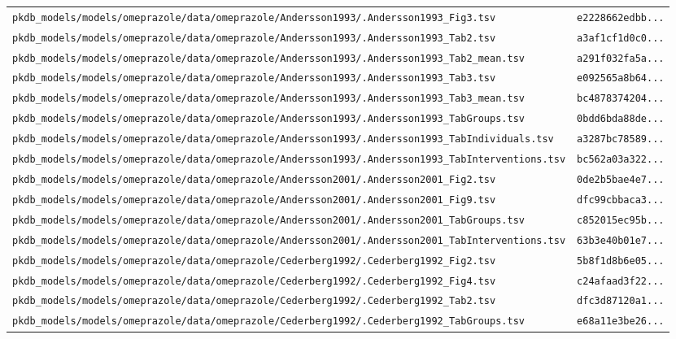 \documentclass{article}
\begin{document}
\begin{longtable}{ll}
\texttt{pkdb\_models/models/omeprazole/data/omeprazole/Andersson1993/.Andersson1993\_Fig3.tsv} & \texttt{e2228662edbb...} \\
\texttt{pkdb\_models/models/omeprazole/data/omeprazole/Andersson1993/.Andersson1993\_Tab2.tsv} & \texttt{a3af1cf1d0c0...} \\
\texttt{pkdb\_models/models/omeprazole/data/omeprazole/Andersson1993/.Andersson1993\_Tab2\_mean.tsv} & \texttt{a291f032fa5a...} \\
\texttt{pkdb\_models/models/omeprazole/data/omeprazole/Andersson1993/.Andersson1993\_Tab3.tsv} & \texttt{e092565a8b64...} \\
\texttt{pkdb\_models/models/omeprazole/data/omeprazole/Andersson1993/.Andersson1993\_Tab3\_mean.tsv} & \texttt{bc4878374204...} \\
\texttt{pkdb\_models/models/omeprazole/data/omeprazole/Andersson1993/.Andersson1993\_TabGroups.tsv} & \texttt{0bdd6bda88de...} \\
\texttt{pkdb\_models/models/omeprazole/data/omeprazole/Andersson1993/.Andersson1993\_TabIndividuals.tsv} & \texttt{a3287bc78589...} \\
\texttt{pkdb\_models/models/omeprazole/data/omeprazole/Andersson1993/.Andersson1993\_TabInterventions.tsv} & \texttt{bc562a03a322...} \\
\texttt{pkdb\_models/models/omeprazole/data/omeprazole/Andersson2001/.Andersson2001\_Fig2.tsv} & \texttt{0de2b5bae4e7...} \\
\texttt{pkdb\_models/models/omeprazole/data/omeprazole/Andersson2001/.Andersson2001\_Fig9.tsv} & \texttt{dfc99cbbaca3...} \\
\texttt{pkdb\_models/models/omeprazole/data/omeprazole/Andersson2001/.Andersson2001\_TabGroups.tsv} & \texttt{c852015ec95b...} \\
\texttt{pkdb\_models/models/omeprazole/data/omeprazole/Andersson2001/.Andersson2001\_TabInterventions.tsv} & \texttt{63b3e40b01e7...} \\
\texttt{pkdb\_models/models/omeprazole/data/omeprazole/Cederberg1992/.Cederberg1992\_Fig2.tsv} & \texttt{5b8f1d8b6e05...} \\
\texttt{pkdb\_models/models/omeprazole/data/omeprazole/Cederberg1992/.Cederberg1992\_Fig4.tsv} & \texttt{c24afaad3f22...} \\
\texttt{pkdb\_models/models/omeprazole/data/omeprazole/Cederberg1992/.Cederberg1992\_Tab2.tsv} & \texttt{dfc3d87120a1...} \\
\texttt{pkdb\_models/models/omeprazole/data/omeprazole/Cederberg1992/.Cederberg1992\_TabGroups.tsv} & \texttt{e68a11e3be26...} \\

\end{longtable}
\end{document}
